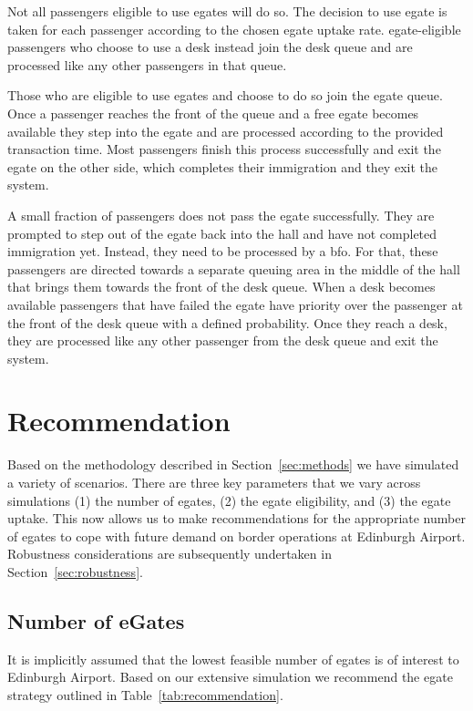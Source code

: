 \documentclass[10pt]{article}
\begin{document}
Not all passengers eligible to use \glspl{egate} will do so. The decision to use \gls{egate} is taken for each passenger according to the chosen \gls{egate} uptake rate. \gls{egate}-eligible passengers who choose to use a desk instead join the desk queue and are processed like any other passengers in that queue. 

Those who are eligible to use \glspl{egate} and choose to do so join the \gls{egate} queue. Once a passenger reaches the front of the queue and a free \gls{egate} becomes available they step into the \gls{egate} and are processed according to the provided transaction time. Most passengers finish this process successfully and exit the \gls{egate} on the other side, which completes their immigration and they exit the system.

A small fraction of passengers does not pass the \gls{egate} successfully. They are prompted to step out of the \gls{egate} back into the hall and have not completed immigration yet. Instead, they need to be processed by a \gls{bfo}. For that, these passengers are directed towards a separate queuing area in the middle of the hall that brings them towards the front of the desk queue. When a desk becomes available passengers that have failed the \gls{egate} have priority over the passenger at the front of the desk queue with a defined probability. Once they reach a desk, they are processed like any other passenger from the desk queue and exit the system.



\section{Recommendation}

Based on the methodology described in Section~\ref{sec:methods} we have simulated a variety of scenarios. There are three key parameters that we vary across simulations (1) the number of \glspl{egate}, (2) the \gls{egate} eligibility, and (3) the \gls{egate} uptake. This now allows us to make recommendations for the appropriate number of \glspl{egate} to cope with future demand on border operations at Edinburgh Airport. Robustness considerations are subsequently undertaken in Section~\ref{sec:robustness}. 

\subsection{Number of eGates}

It is implicitly assumed that the lowest feasible number of \glspl{egate} is of interest to Edinburgh Airport. Based on our extensive simulation we recommend the \gls{egate} strategy outlined in Table~\ref{tab:recommendation}. 
\end{document}
